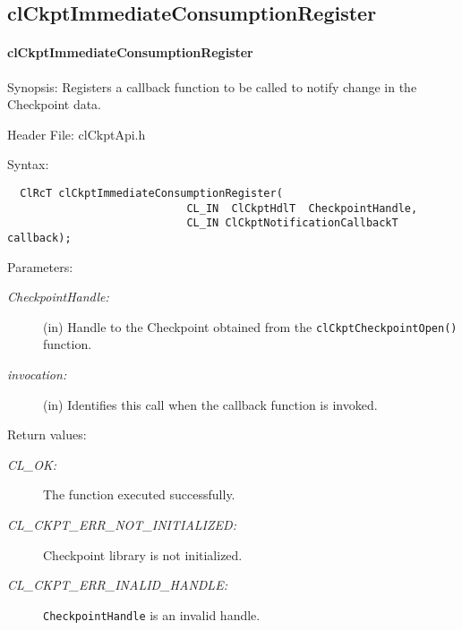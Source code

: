 \begin{flushleft}
\subsection{clCkptImmediateConsumptionRegister}
\hypertarget{pageckpt121}{}\paragraph{cl\-Ckpt\-Immediate\-Consumption\-Register}\label{pageckpt121}
\begin{Desc}
\item[Synopsis:]Registers a callback function to be called to notify change in the Checkpoint data.\end{Desc}
\begin{Desc}
\item[Header File:]clCkptApi.h\end{Desc}
\begin{Desc}
\item[Syntax:]

\footnotesize\begin{verbatim}  ClRcT clCkptImmediateConsumptionRegister(
                     		CL_IN  ClCkptHdlT  CheckpointHandle,
                     		CL_IN ClCkptNotificationCallbackT callback);
\end{verbatim}
\normalsize
\end{Desc}
\begin{Desc}
\item[Parameters:]
\begin{description}
\item[{\em Checkpoint\-Handle:}](in) Handle to the Checkpoint obtained from the {\tt{clCkptCheckpointOpen()}} function. 
\item[{\em invocation:}](in) Identifies this call when the callback function is invoked.\end{description}
\end{Desc}
\begin{Desc}
\item[Return values:]
\begin{description}
\item[{\em CL\_\-OK:}]The function executed successfully.
\item[{\em CL\_\-CKPT\_\-ERR\_\-NOT\_\-INITIALIZED:}]Checkpoint library is not initialized. 
\item[{\em CL\_\-CKPT\_\-ERR\_\-INALID\_\-HANDLE:}]{\tt{CheckpointHandle}} is an invalid handle.


\end{description}
\end{Desc}
\end{flushleft}
